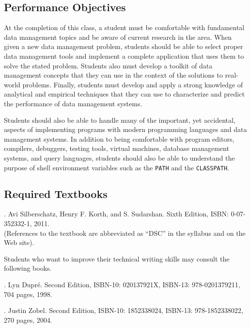 \subsection*{Performance Objectives}

At the completion of this class, a student must be comfortable with fundamental data management topics and be aware of
current research in the area.  When given a new data management problem, students should be able to select proper data
management tools and implement a complete application that uses them to solve the stated problem.  Students also must
develop a toolkit of data management concepts that they can use in the context of the solutions to real-world problems.
Finally, students must develop and apply a strong knowledge of analytical and empirical techniques that they can use to
characterize and predict the performance of data management systems.

Students should also be able to handle many of the important, yet accidental, aspects of implementing programs with
modern programming languages and data management systems.  In addition to being comfortable with program editors,
compilers, debuggers, testing tools, virtual machines, database management systems, and query languages, students should
also be able to understand the purpose of shell environment variables such as the {\tt PATH} and the {\tt CLASSPATH}.

\subsection*{Required Textbooks}


. Avi Silberschatz, Henry F. Korth, and S. Sudarshan.
Sixth Edition, ISBN: 0-07-352332-1, 2011. \\
(References to the textbook are abbreviated as ``DSC'' in the syllabus and on the Web site).

\noindent
Students who want to improve their technical writing skills may consult the following books.

. Lyn Dupr\'e. Second Edition,  ISBN-10: 020137921X,
ISBN-13: 978-0201379211, 704 pages, 1998.

.  Justin Zobel. Second Edition,  ISBN-10: 1852338024, ISBN-13:
978-1852338022, 270 pages, 2004.

